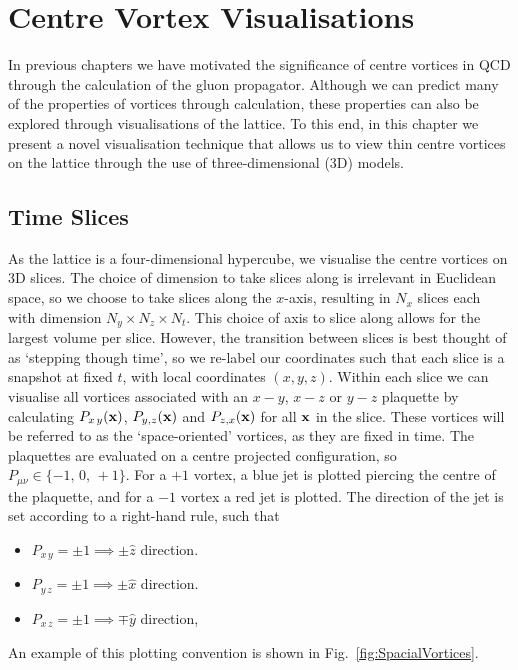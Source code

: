 
\chapter{Centre Vortex Visualisations}
\ifpdf
    \graphicspath{{Chapter7/Figs/Raster/}{Chapter7/Figs/PDF/}{Chapter7/Figs/}}
\else
    \graphicspath{{Chapter7/Figs/Vector/}{Chapter7/Figs/}}
\fi

In previous chapters we have motivated the significance of centre vortices in QCD through the calculation of the gluon propagator. Although we can predict many of the properties of vortices through calculation, these properties can also be explored through visualisations of the lattice. To this end, in this chapter we present a novel visualisation technique that allows us to view thin centre vortices on the lattice through the use of three-dimensional (3D) models.

\section{Time Slices}
As the lattice is a four-dimensional hypercube, we visualise the centre vortices on 3D slices. The choice of dimension to take slices along is irrelevant in Euclidean space, so we choose to take slices along the $x$-axis, resulting in $N_x$ slices each with dimension $N_y\times N_z\times N_t$. This choice of axis to slice along allows for the largest volume per slice.  However, the transition between slices is best thought of as `stepping though time', so we re-label our coordinates such that each slice is a snapshot at fixed $t$, with local coordinates $(x,y,z)$. Within each slice we can visualise all vortices associated with an $x-y$, $x-z$ or $y-z$ plaquette by calculating $P_{x\,y}(\bf{x})$, $P_{y,z}(\bf{x})$ and $P_{z,x}(\bf{x})$ for all $\bf{x}$ in the slice. These vortices will be referred to as the `space-oriented' vortices, as they are fixed in time. The plaquettes are evaluated on a centre projected configuration, so $P_{\mu\nu}\in \lbrace -1,\,0,\,+1\rbrace$. For a $+1$ vortex, a blue jet is plotted piercing the centre of the plaquette, and for a $-1$ vortex a red jet is plotted. The direction of the jet is set according to a right-hand rule, such that
\begin{itemize}[leftmargin=*,itemsep=0pt,labelsep=12pt]
\item $P_{x\,y}=\pm 1\implies \pm\hat{z}$ direction.
\item $P_{y\,z}=\pm 1\implies \pm\hat{x}$ direction.
\item $P_{x\,z}=\pm 1\implies \mp\hat{y}$ direction,
\end{itemize}
An example of this plotting convention is shown in Fig.~\ref{fig:SpacialVortices}.\\

